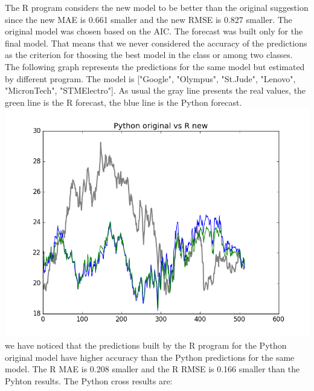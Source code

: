 \documentclass [twoside,
  11pt, a4paper,
  footinclude=true,
  headinclude=true,
  cleardoublepage=empty
]{article}
\begin{document}
The R program considers the new model to be better than the original suggestion since the new MAE is 0.661 smaller and the new RMSE is 0.827 smaller. The original model was chosen based on the AIC. The forecast was built only for the final model. That means that we never considered the accuracy of the predictions as the criterion for thoosing the best model in the class or among two classes.\\
The following graph represents the predictions for the same model but estimated by different program. The model is ["Google", "Olympus", "St.Jude", "Lenovo", "MicronTech", "STMElectro"]. As usual the gray line presents the real values, the green line is the R forecast, the blue line is the Python forecast.\\
\includegraphics[scale=0.75]{PythonOriginalVsRNew.png}
we have noticed that the predictions built by the R program for the Python original model have higher accuracy than the Python predictions for the same model. The R MAE is 0.208 smaller and the R RMSE is 0.166 smaller than the Pyhton results.
The Python cross results are:
\end{document}
